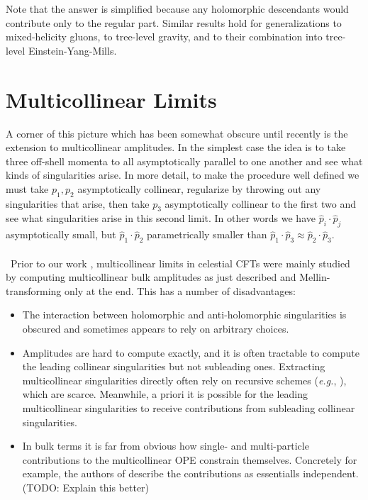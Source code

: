 \documentclass[11pt,letterpaper]{article}
\begin{document}
Note that the answer is simplified because any holomorphic descendants would contribute only to the regular part. Similar results hold for generalizations to mixed-helicity gluons, to tree-level gravity, and to their combination into tree-level Einstein-Yang-Mills.















\section{Multicollinear Limits}
A corner of this picture which has been somewhat obscure until recently is the extension to multicollinear amplitudes. In the simplest case the idea is to take three off-shell momenta to all asymptotically parallel to one another and see what kinds of singularities arise. In more detail, to make the procedure well defined we must take $p_1, p_2$ asymptotically collinear, regularize by throwing out any singularities that arise, then take $p_3$ asymptotically collinear to the first two and see what singularities arise in this second limit. In other words we have $\hat{p}_i \cdot \hat{p}_j$ asymptotically small, but $\hat{p}_1 \cdot \hat{p}_2$ parametrically smaller than $\hat{p}_1 \cdot \hat{p}_3 \approx \hat{p}_2 \cdot \hat{p}_3$.\\
\\
\
Prior to our work \cite{Calkins:2026hpg}, multicollinear limits in celestial CFTs were mainly studied by computing multicollinear bulk amplitudes as just described and Mellin-transforming only at the end. This has a number of disadvantages: \begin{itemize}
    \item The interaction between holomorphic and anti-holomorphic singularities is obscured and sometimes appears to rely on arbitrary choices.
    \item Amplitudes are hard to compute exactly, and it is often tractable to compute the leading collinear singularities but not subleading ones. Extracting multicollinear singularities directly often rely on recursive schemes (\textit{e.g.}, \cite{Marquard:2005rh}), which are scarce. Meanwhile, a priori it is possible for the leading multicollinear singularities to receive contributions from subleading collinear singularities.
    \item In bulk terms it is far from obvious how single- and multi-particle contributions to the multicollinear OPE constrain themselves. Concretely for example, the authors of \cite{Guevara:2024ixn} describe the contributions as essentialls independent. (TODO: Explain this better)
\end{itemize}
\end{document}
